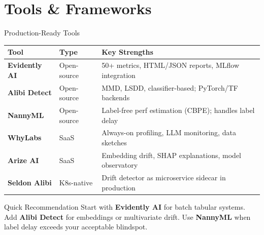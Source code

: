 \documentclass[10pt,aspectratio=169]{beamer}
\begin{document}
\section{Tools \& Frameworks}

\begin{frame}{Production-Ready Tools}
  \begin{center}
  \renewcommand{\arraystretch}{1.25}
  \begin{tabular}{@{}p{2.6cm}p{2.8cm}p{6.2cm}@{}}
    \toprule
    \textbf{Tool}         & \textbf{Type}    & \textbf{Key Strengths} \\
    \midrule
    \textbf{Evidently AI} & Open-source      & 50+ metrics, HTML/JSON reports, MLflow integration \\
    \textbf{Alibi Detect} & Open-source      & MMD, LSDD, classifier-based; PyTorch/TF backends \\
    \textbf{NannyML}      & Open-source      & Label-free perf estimation (CBPE); handles label delay \\
    \textbf{WhyLabs}      & SaaS             & Always-on profiling, LLM monitoring, data sketches \\
    \textbf{Arize AI}     & SaaS             & Embedding drift, SHAP explanations, model observatory \\
    \textbf{Seldon Alibi} & K8s-native       & Drift detector as microservice sidecar in production \\
    \bottomrule
  \end{tabular}
  \end{center}
  \vspace{0.2cm}
  \begin{block}{Quick Recommendation}
    Start with \textbf{Evidently AI} for batch tabular systems.
    Add \textbf{Alibi Detect} for embeddings or multivariate drift.
    Use \textbf{NannyML} when label delay exceeds your acceptable blindspot.
  \end{block}
\end{frame}
\end{document}
